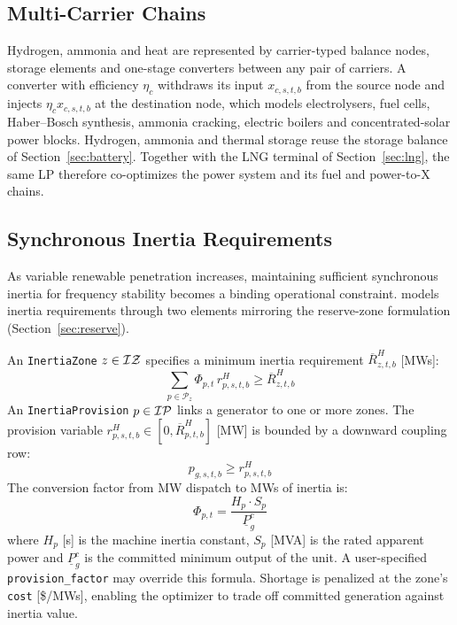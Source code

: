 \subsection{Multi-Carrier Chains}
\label{sec:carriers}

Hydrogen, ammonia and heat are represented by carrier-typed balance
nodes, storage elements and one-stage converters between any pair of
carriers.  A converter with efficiency $\eta_c$ withdraws its input
$x_{c,s,t,b}$ from the source node and injects $\eta_c x_{c,s,t,b}$ at
the destination node, which models electrolysers, fuel cells,
Haber--Bosch synthesis, ammonia cracking, electric boilers and
concentrated-solar power blocks.  Hydrogen, ammonia and thermal storage
reuse the storage balance of Section~\ref{sec:battery}.  Together with
the LNG terminal of Section~\ref{sec:lng}, the same LP therefore
co-optimizes the power system and its fuel and power-to-X chains.

\subsection{Synchronous Inertia Requirements}
\label{sec:inertia}

As variable renewable penetration increases, maintaining sufficient
synchronous inertia for frequency stability becomes a binding operational
constraint.  \gtopt{} models inertia requirements through two elements
mirroring the reserve-zone formulation (Section~\ref{sec:reserve}).

An \texttt{InertiaZone} $z \in \mathcal{IZ}$ specifies a minimum inertia
requirement $\overline{R}_{z,t,b}^{H}$ [MWs]:
\begin{equation}
\label{eq:inertia_req}
\sum_{p \in \mathcal{P}_z} \Phi_{p,t} \, r_{p,s,t,b}^{H}
  \geq \overline{R}_{z,t,b}^{H}
\end{equation}
An \texttt{InertiaProvision} $p \in \mathcal{IP}$ links a generator to
one or more zones.  The provision variable
$r_{p,s,t,b}^{H} \in [0, \overline{R}_{p,t,b}^{H}]$ [MW] is bounded
by a downward coupling row:
\begin{equation}
\label{eq:inertia_coupling}
p_{g,s,t,b} \geq r_{p,s,t,b}^{H}
\end{equation}
The conversion factor from MW dispatch to MWs of inertia is:
\begin{equation}
\Phi_{p,t} = \frac{H_p \cdot S_p}{\underline{P}^c_g}
\end{equation}
where $H_p$ [s] is the machine inertia constant, $S_p$ [MVA] is the
rated apparent power and $\underline{P}^c_g$ is the committed minimum
output of the unit.  A user-specified \texttt{provision\_factor} may
override this formula.  Shortage is penalized at the zone's
\texttt{cost} [\$/MWs], enabling the optimizer to trade off committed
generation against inertia value.

